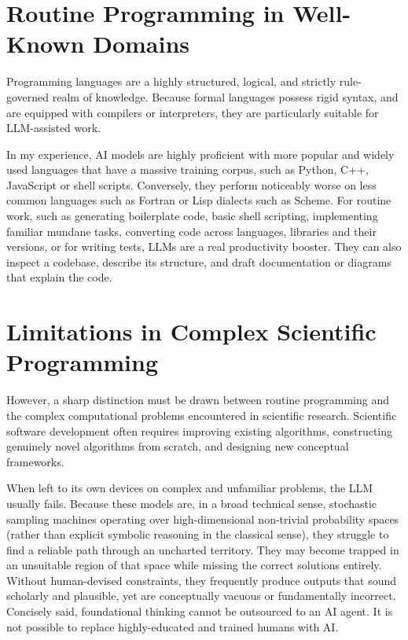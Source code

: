 \documentclass[10pt,a4paper]{article}
\begin{document}
\section{Routine Programming in Well-Known Domains}
Programming languages are a highly structured, logical, and strictly rule-governed realm of knowledge. Because formal languages possess rigid syntax, and are equipped with compilers or interpreters, they are particularly suitable for LLM-assisted work.

In my experience, AI models are highly proficient with more popular and widely used languages that have a massive training corpus, such as Python, C++, JavaScript or shell scripts. Conversely, they perform noticeably worse on less common languages such as Fortran or Lisp dialects such as Scheme. For routine work, such as generating boilerplate code, basic shell scripting, implementing familiar mundane tasks, converting code across languages, libraries and their versions, or for writing tests, LLMs are a real productivity booster. They can also inspect a codebase, describe its structure, and draft documentation or diagrams that explain the code.

\section{Limitations in Complex Scientific Programming}
However, a sharp distinction must be drawn between routine programming and the complex computational problems encountered in scientific research. Scientific software development often requires improving existing algorithms, constructing genuinely novel algorithms from scratch, and designing new conceptual frameworks.

When left to its own devices on complex and unfamiliar problems, the LLM usually fails. Because these models are, in a broad technical sense, stochastic sampling machines operating over high-dimensional non-trivial probability spaces (rather than explicit symbolic reasoning in the classical sense), they struggle to find a reliable path through an uncharted territory. They may become trapped in an unsuitable region of that space while missing the correct solutions entirely. Without human-devised constraints, they frequently produce outputs that sound scholarly and plausible, yet are conceptually vacuous or fundamentally incorrect. Concisely said, foundational thinking cannot be outsourced to an AI agent. It is not possible to replace highly-educated and trained humans with AI.
\end{document}
